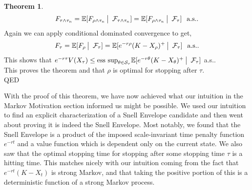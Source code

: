 \documentclass[12pt]{article}
\newcommand{\cF}{\mathcal{F}}
\newcommand{\cS}{\mathcal{S}}
\newcommand{\E}{\mathbb{E}}
\newcommand{\quantifyspace}{\hspace{2px} \big | \hspace{5px}}
\newcommand{\spc}{\hspace{7 px}}
\newcommand{\als}{\text{a.s.}}
\newcommand{\esssup}{\text{ess sup}}
\newcommand{\QED}{\hspace*{\fill}\textup{QED}}
\theoremstyle{definition}
\newtheorem{thm}{Theorem}
\begin{document}
\begin{thm}
\[
    F_{\tau \wedge \tau_n} = \E[F_{\rho \wedge \tau_n} \quantifyspace \cF_{\tau \wedge \tau_n}] =
    \E[F_{\rho \wedge \tau_n} \quantifyspace \cF_\tau] \spc \als.
\]
Again we can apply conditional dominated convergence to get,
\[
    F_\tau = \E[F_\rho \quantifyspace \cF_\tau] = \E[e^{-r \rho} (K - X_\rho)^+ \quantifyspace \cF_\tau] \spc \als.
\]
This shows that $e^{-r \tau} V(X_\tau) \leq \esssup_{\theta \in \cS_\tau} \E[e^{-r \theta} (K - X_\theta)^+ \quantifyspace \cF_\tau]$ a.s.. \\
This proves the theorem and that $\rho$ is optimal for stopping after $\tau$. \\
\QED \\
\end{thm}

With the proof of this theorem, we have now achieved what our intuition in the Markov Motivation section informed us might be possible. 
We used our intuition to find an explicit characterization of a Snell Envelope candidate and then went about proving it is indeed the Snell Envelope. 
Most notably, we found that the Snell Envelope is a product of the imposed scale-invariant time penalty function $e^{-rt}$ and a value function which is dependent only on the current state.
We also saw that the optimal stopping time for stopping after some stopping time $\tau$ is a hitting time.
This matches nicely with our intuition coming from the fact that $e^{-rt} (K - X_t)$ is strong Markov, and that taking the positive portion of this is a deterministic function of a strong Markov process. 
\end{document}
